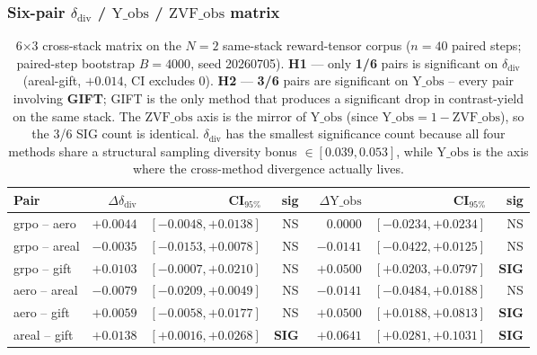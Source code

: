 \subsubsection{Six-pair $\delta_{\mathrm{div}}$ / $\mathrm{Y\_obs}$ / $\mathrm{ZVF\_obs}$ matrix}

\begin{table}[h]
\centering
\footnotesize
\begin{tabular}{l r r r r r r}
\toprule
\textbf{Pair} & $\Delta\delta_{\mathrm{div}}$ & CI$_{95\%}$ & sig
            & $\Delta\mathrm{Y\_obs}$ & CI$_{95\%}$ & sig \\
\midrule
grpo -- aero  & $+0.0044$ & $[-0.0048,+0.0138]$ & NS  & $\phantom{-}0.0000$ & $[-0.0234,+0.0234]$ & NS  \\
grpo -- areal & $-0.0035$ & $[-0.0153,+0.0078]$ & NS  & $-0.0141$            & $[-0.0422,+0.0125]$ & NS  \\
grpo -- gift  & $+0.0103$ & $[-0.0007,+0.0210]$ & NS  & $+0.0500$            & $[+0.0203,+0.0797]$ & \textbf{SIG} \\
aero -- areal & $-0.0079$ & $[-0.0209,+0.0049]$ & NS  & $-0.0141$            & $[-0.0484,+0.0188]$ & NS  \\
aero -- gift  & $+0.0059$ & $[-0.0058,+0.0177]$ & NS  & $+0.0500$            & $[+0.0188,+0.0813]$ & \textbf{SIG} \\
areal -- gift & $+0.0138$ & $[+0.0016,+0.0268]$ & \textbf{SIG} & $+0.0641$ & $[+0.0281,+0.1031]$ & \textbf{SIG} \\
\bottomrule
\end{tabular}
\caption{6$\times$3 cross-stack matrix on the $N\!=\!2$ same-stack
reward-tensor corpus ($n\!=\!40$ paired steps; paired-step bootstrap
$B\!=\!4000$, seed 20260705).
\textbf{H1} --- only \textbf{1/6} pairs is significant on
$\delta_{\mathrm{div}}$ (areal-gift, $+0.014$, CI excludes 0).
\textbf{H2} --- \textbf{3/6} pairs are significant on
$\mathrm{Y\_obs}$ -- every pair involving \textbf{GIFT};
GIFT is the only method that produces a significant drop in
contrast-yield on the same stack. The $\mathrm{ZVF\_obs}$ axis is
the mirror of $\mathrm{Y\_obs}$ (since $\mathrm{Y\_obs}=1-\mathrm{ZVF\_obs}$),
so the 3/6 SIG count is identical.
$\delta_{\mathrm{div}}$ has the smallest significance count
because all four methods share a structural sampling diversity
bonus $\in [0.039,0.053]$, while $\mathrm{Y\_obs}$ is the axis
where the cross-method divergence actually lives.}
\label{tab:p6-iter86-matrix}
\end{table}

